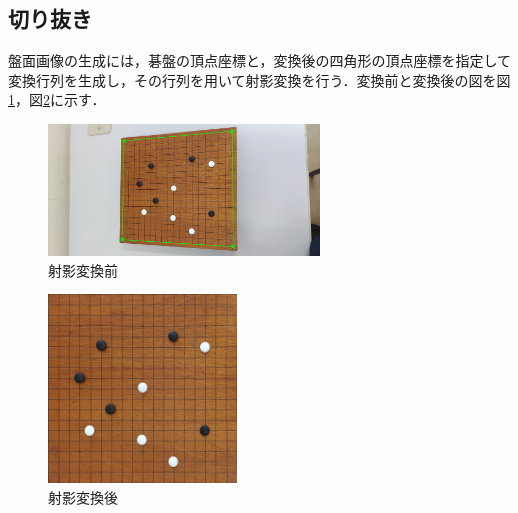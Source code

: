\documentclass[openright]{nitocs}
\numberwithin{equation}{section}
\begin{document}
        \subsection{切り抜き}
            盤面画像の生成には，碁盤の頂点座標と，変換後の四角形の頂点座標を指定して変換行列を生成し，その行列を用いて射影変換を行う．変換前と変換後の図を図\ref{cornerImg}，図\ref{boardImg}に示す．
            \begin{figure} %
                \begin{center}
                \includegraphics[width=72mm,height=35mm]{cornerImg.jpg} 
                \caption{射影変換前}
                \label{cornerImg}
                \end{center}
            \end{figure}
            \begin{figure} %
                \begin{center}
                \includegraphics[width=50mm,height=50mm]{boardImg.jpg} 
                \caption{射影変換後}
                \label{boardImg}
                \end{center}
            \end{figure}
\end{document}
